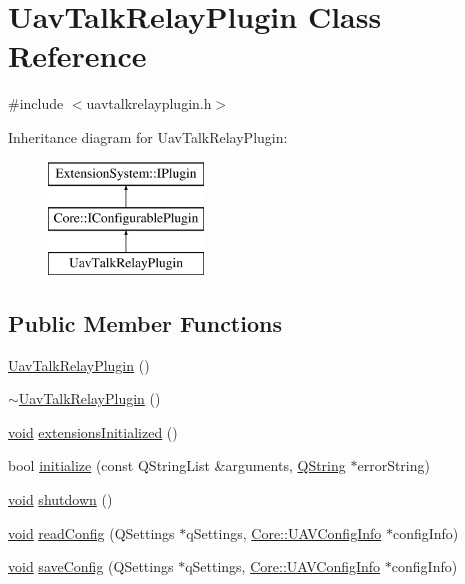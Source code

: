 \hypertarget{class_uav_talk_relay_plugin}{\section{\-Uav\-Talk\-Relay\-Plugin \-Class \-Reference}
\label{class_uav_talk_relay_plugin}
}


{\ttfamily \#include $<$uavtalkrelayplugin.\-h$>$}

\-Inheritance diagram for \-Uav\-Talk\-Relay\-Plugin\-:\begin{figure}[H]
\begin{center}
\leavevmode
\includegraphics[height=3.000000cm]{class_uav_talk_relay_plugin}
\end{center}
\end{figure}
\subsection*{\-Public \-Member \-Functions}
\begin{DoxyCompactItemize}
\item 
\hyperlink{group___u_a_v_talk_ga425fbe805214fb0a0ec2eb24f6bf0af4}{\-Uav\-Talk\-Relay\-Plugin} ()
\item 
\hyperlink{group___u_a_v_talk_gaad7159b5c609edca5e23031119f623c7}{$\sim$\-Uav\-Talk\-Relay\-Plugin} ()
\item 
\hyperlink{group___u_a_v_objects_plugin_ga444cf2ff3f0ecbe028adce838d373f5c}{void} \hyperlink{group___u_a_v_talk_ga23c510f5254ca286083d1b3e4a732582}{extensions\-Initialized} ()
\item 
bool \hyperlink{group___u_a_v_talk_gacb02c97b971babafb922150887825934}{initialize} (const \-Q\-String\-List \&arguments, \hyperlink{group___u_a_v_objects_plugin_gab9d252f49c333c94a72f97ce3105a32d}{\-Q\-String} $\ast$error\-String)
\item 
\hyperlink{group___u_a_v_objects_plugin_ga444cf2ff3f0ecbe028adce838d373f5c}{void} \hyperlink{group___u_a_v_talk_ga2a3c3d63a751ae8931cfbd8cf30792ba}{shutdown} ()
\item 
\hyperlink{group___u_a_v_objects_plugin_ga444cf2ff3f0ecbe028adce838d373f5c}{void} \hyperlink{group___u_a_v_talk_ga56f6231aec2bb6b547cd07b4533cb949}{read\-Config} (\-Q\-Settings $\ast$q\-Settings, \hyperlink{class_core_1_1_u_a_v_config_info}{\-Core\-::\-U\-A\-V\-Config\-Info} $\ast$config\-Info)
\item 
\hyperlink{group___u_a_v_objects_plugin_ga444cf2ff3f0ecbe028adce838d373f5c}{void} \hyperlink{group___u_a_v_talk_ga36180ad0b7197a844dfe5ff50a116aa1}{save\-Config} (\-Q\-Settings $\ast$q\-Settings, \hyperlink{class_core_1_1_u_a_v_config_info}{\-Core\-::\-U\-A\-V\-Config\-Info} $\ast$config\-Info)
\end{DoxyCompactItemize}
